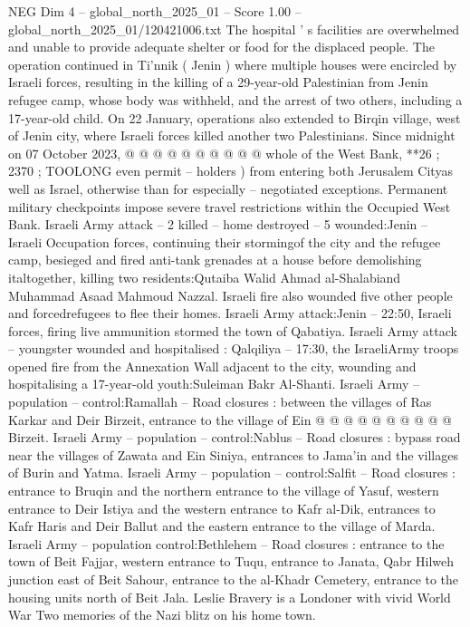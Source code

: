 \begin{textsample}{NEG Dim 4 – global\_north\_2025\_01 – Score 1.00 – global\_north\_2025\_01/120421006.txt}
The hospital ' s facilities are overwhelmed and unable to provide adequate shelter or food for the displaced people.
The operation continued in Ti'nnik ( Jenin ) where multiple houses were encircled by Israeli forces, resulting in the killing of a 29-year-old Palestinian from Jenin refugee camp, whose body was withheld, and the arrest of two others, including a 17-year-old child.
On 22 January, operations also extended to Birqin village, west of Jenin city, where Israeli forces killed another two Palestinians.
Since midnight on 07 October 2023, @ @ @ @ @ @ @ @ @ @ whole of the West Bank, **26 ; 2370 ; TOOLONG even permit -- holders ) from entering both Jerusalem Cityas well as Israel, otherwise than for especially -- negotiated exceptions.
Permanent military checkpoints impose severe travel restrictions within the Occupied West Bank.
Israeli Army attack -- 2 killed -- home destroyed -- 5 wounded:Jenin -- Israeli Occupation forces, continuing their stormingof the city and the refugee camp, besieged and fired anti-tank grenades at a house before demolishing italtogether, killing two residents:Qutaiba Walid Ahmad al-Shalabiand Muhammad Asaad Mahmoud Nazzal.
Israeli fire also wounded five other people and forcedrefugees to flee their homes.
Israeli Army attack:Jenin -- 22:50, Israeli forces, firing live ammunition stormed the town of Qabatiya.
Israeli Army attack -- youngster wounded and hospitalised : Qalqiliya -- 17:30, the IsraeliArmy troops opened fire from the Annexation Wall adjacent to the city, wounding and hospitalising a 17-year-old youth:Suleiman Bakr Al-Shanti.
Israeli Army -- population -- control:Ramallah -- Road closures : between the villages of Ras Karkar and Deir Birzeit, entrance to the village of Ein @ @ @ @ @ @ @ @ @ @ Birzeit.
Israeli Army -- population -- control:Nablus -- Road closures : bypass road near the villages of Zawata and Ein Siniya, entrances to Jama'in and the villages of Burin and Yatma.
Israeli Army -- population -- control:Salfit -- Road closures : entrance to Bruqin and the northern entrance to the village of Yasuf, western entrance to Deir Istiya and the western entrance to Kafr al-Dik, entrances to Kafr Haris and Deir Ballut and the eastern entrance to the village of Marda.
Israeli Army -- population control:Bethlehem -- Road closures : entrance to the town of Beit Fajjar, western entrance to Tuqu, entrance to Janata, Qabr Hilweh junction east of Beit Sahour, entrance to the al-Khadr Cemetery, entrance to the housing units north of Beit Jala.
Leslie Bravery is a Londoner with vivid World War Two memories of the Nazi blitz on his home town.

\end{textsample}
